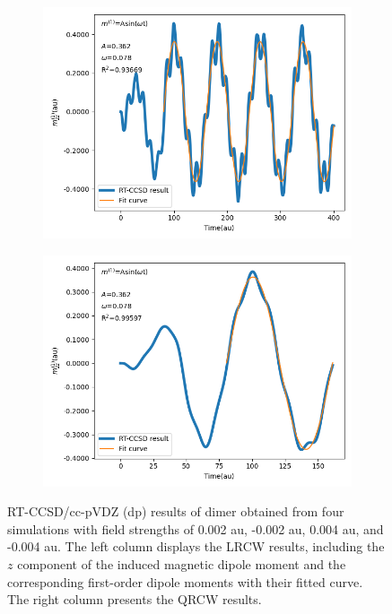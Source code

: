 \begin{figure}
     \vfill
     \begin{subfigure}{0.47\textwidth}
         \centering
         \includegraphics[width=\textwidth]{ch4/Figs/5-2.png}
     \end{subfigure}
     \hfill
     \begin{subfigure}{0.47\textwidth}
         \centering
         \includegraphics[width=\textwidth]{ch4/Figs/5-4.png}
     \end{subfigure}
     \caption{RT-CCSD/cc-pVDZ (dp) results of  dimer obtained from four simulations with field strengths of 0.002 au, -0.002 au, 0.004 au, and -0.004 au. The left column displays the LRCW results, including the $z$ component of the induced magnetic dipole moment and the corresponding first-order dipole moments with their fitted curve. The right column presents the QRCW results.}
     \label{fig:g-fit}
\end{figure}
